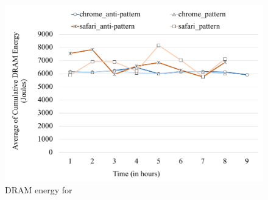 \begin{figure}[ht]
 	\includegraphics[width=\linewidth]{RQ3/Img/rq3-DRR-cumulative-DRAM-eng.pdf}
	\caption{DRAM energy for \drr}
	\label{fig:rq3-drr-package-eng}	
\end{figure}